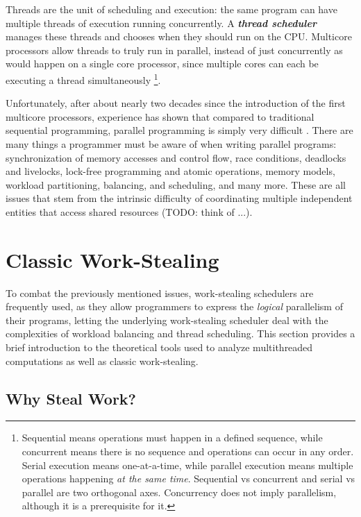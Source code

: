 \documentclass[bsc,frontabs,singlespacing,parskip,deptreport,normalheadings]{infthesis}
\begin{document}
Threads are the unit of scheduling and execution: the same
program can have multiple threads of execution running concurrently. A
\textit{\textbf{thread scheduler}} manages these threads and chooses when they
should run on the CPU. Multicore processors allow threads to truly run in
parallel, instead of just concurrently as would happen on a single core
processor, since multiple cores can each be executing a thread simultaneously
\footnote{Sequential means operations must happen in a defined sequence, while
    concurrent means there is no sequence and operations can occur in any order.
    Serial execution means one-at-a-time, while parallel execution means
    multiple operations happening \textit{at the same time}. Sequential vs
concurrent and serial vs parallel are two orthogonal axes. Concurrency does not
imply parallelism, although it is a prerequisite for it.}.

Unfortunately, after about nearly two decades since the introduction of the
first multicore processors, experience has shown that compared to traditional
sequential programming, parallel programming is simply very difficult
\cite{creeger_multicore_2005, lee_problem_2006, patterson_trouble_2010}. There
are many things a programmer must be aware of when writing parallel programs:
synchronization of memory accesses and control flow, race conditions,
deadlocks and livelocks, lock-free programming and atomic operations, memory
models, workload partitioning, balancing, and scheduling, and many more. These
are all issues that stem from the intrinsic difficulty of coordinating multiple
independent entities that access shared resources (TODO: think of ...).

\section{Classic Work-Stealing}

To combat the previously mentioned issues, work-stealing schedulers are
frequently used, as they allow programmers to express the \textit{logical}
parallelism of their programs, letting the underlying work-stealing scheduler
deal with the complexities of workload balancing and thread scheduling. This
section provides a brief introduction to the theoretical tools used to analyze
multithreaded computations as well as classic work-stealing.

\subsection{Why Steal Work?}
\end{document}
